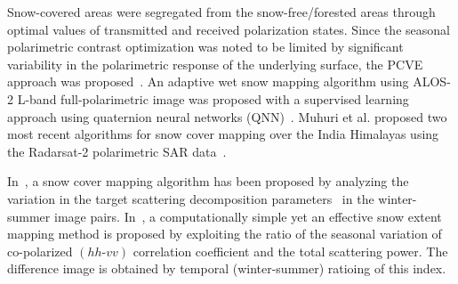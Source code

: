 Snow-covered areas were segregated from the snow-free/forested areas through optimal values of transmitted and received polarization states. Since the seasonal polarimetric contrast optimization was noted to be limited by significant variability in the polarimetric response of the underlying surface, the PCVE approach was proposed~\cite{martini2006dry}. An adaptive wet snow mapping algorithm using ALOS-2 L-band full-polarimetric image was proposed with a supervised learning approach using quaternion neural networks (QNN)~\cite{usami2016polsar}.
%
Muhuri et al. proposed two most recent algorithms for snow cover mapping over the India Himalayas using the Radarsat-2 polarimetric SAR data~\cite{Muhuri_Scattering_Mechanism_2017,Muhuri_Seasonal_Snow_Cover_2017}.

In~\cite{Muhuri_Scattering_Mechanism_2017}, a snow cover mapping algorithm has been proposed by analyzing the variation in the target scattering decomposition parameters~\cite{touzi2007target, lee2009polarimetric} in the winter-summer image pairs. In~\cite{Muhuri_Seasonal_Snow_Cover_2017}, a computationally simple yet an effective snow extent mapping method is proposed by exploiting the ratio of the seasonal variation of co-polarized $(hh\mbox{-}vv)$ correlation coefficient and the total scattering power. The difference image is obtained by temporal (winter-summer) ratioing of this index. 

